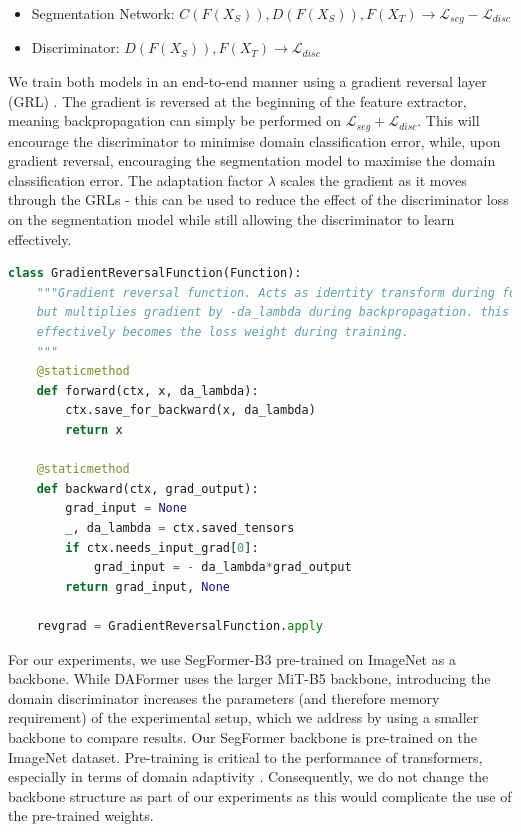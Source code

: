 \documentclass[a4paper,12pt]{report}
\begin{document}
\begin{itemize}
    \item Segmentation Network: $C(F(X_S)), D(F(X_S)), F(X_T) \rightarrow \mathcal{L}_{seg} - \mathcal{L}_{disc} $
    \item Discriminator: $D(F(X_S)), F(X_T) \rightarrow \mathcal{L}_{disc}$
\end{itemize}

We train both models in an end-to-end manner using a gradient reversal layer (GRL) \cite{ganin_domain-adversarial_2016}. The gradient is reversed at the beginning of the feature extractor, meaning backpropagation can simply be performed on $\mathcal{L}_{seg} + \mathcal{L}_{disc}$. This will encourage the discriminator to minimise domain classification error, while, upon gradient reversal, encouraging the segmentation model to maximise the domain classification error. The adaptation factor $\lambda$ scales the gradient as it moves through the GRLs - this can be used to reduce the effect of the discriminator loss on the segmentation model while still allowing the discriminator to learn effectively.

\bigbreak
\begin{lstlisting}[language=Python, caption=Gradient reversal function implemented in PyTorch \cite{paszke_pytorch_2019}. Based on \url{https://github.com/tadeephuy/GradientReversal}]
class GradientReversalFunction(Function):
    """Gradient reversal function. Acts as identity transform during forward pass, 
    but multiplies gradient by -da_lambda during backpropagation. this means da_lambda 
    effectively becomes the loss weight during training.
    """
    @staticmethod
    def forward(ctx, x, da_lambda):
        ctx.save_for_backward(x, da_lambda)
        return x
    
    @staticmethod
    def backward(ctx, grad_output):
        grad_input = None
        _, da_lambda = ctx.saved_tensors
        if ctx.needs_input_grad[0]:
            grad_input = - da_lambda*grad_output
        return grad_input, None

    revgrad = GradientReversalFunction.apply
\end{lstlisting}

For our experiments, we use SegFormer-B3 \cite{xie_segformer_2021} pre-trained on ImageNet as a backbone. While DAFormer uses the larger MiT-B5 backbone, introducing the domain discriminator increases the parameters (and therefore memory requirement) of the experimental setup, which we address by using a smaller backbone to compare results. Our SegFormer backbone is pre-trained on the ImageNet dataset. Pre-training is critical to the performance of transformers, especially in terms of domain adaptivity \cite{dosovitskiy_image_2021}. Consequently, we do not change the backbone structure as part of our experiments as this would complicate the use of the pre-trained weights.
\end{document}
